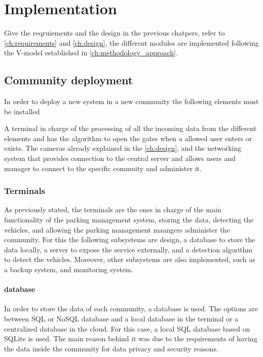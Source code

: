 \chapter{Implementation}\label{ch:implementation}

Give the reqruiements and the design in the previous chatpers, refer to \cref{ch:requirements} and \cref{ch:design}, the different modules are implemented following the V-model established in \cref{ch:methodology_approach}.


\section{Community deployment}

In order to deploy a new system in a new community the following elements must be installed


A terminal in charge of the processing of all the incoming data from the different elements and has the algorithm to open the gates when a allowed user enters or exists. The cameras already explained in the \cref{ch:design}, and the networking system that provides connection to the central server and allows users and manager to connect to the specific commuity and administer it.

\subsection{Terminals}

As previously stated, the terminals are the ones in charge of the main functionality of the parking management system, storing the data, detecting the vehicles, and allowing the parking management maangers administer the community. For this the following subsystems are design, a database to store the data locally, a server to expose the service externally, and a detection algorithm to detect the vehicles. Moreover, other subsystems are also implemented, such as a backup system, and monitoring system.


\subsubsection{database}

In order to store the data of each community, a database is used. The options are between SQL or NoSQL database and a local database in the terminal or a centralized database in the cloud. For this case, a local SQL database based on SQLite  is used. The main reason behind it was due to the requirements of having the data inside the community for data privacy and security reasons.

